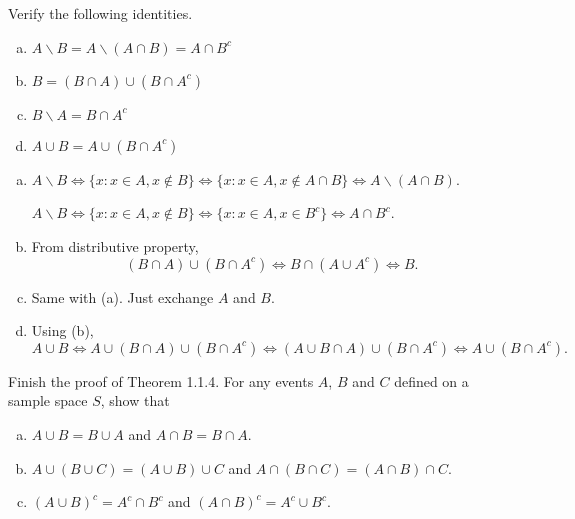 \documentclass[14pt]{elegantbook}
\begin{document}

\chapter{}

    \setcounter{exer}{1}
    \begin{exercise}
        Verify the following identities. 
        \begin{enumerate}[(a)]
            \item $A\backslash B=A\backslash (A\cap B)=A\cap B^c$
            \item $B=(B\cap A)\cup (B\cap A^c)$
            \item $B\backslash A=B\cap A^c$
            \item $A\cup B=A\cup (B\cap A^c)$
        \end{enumerate}
    \end{exercise}

    \begin{solution}
        \begin{enumerate}[(a)]
            \item $A\backslash B \Leftrightarrow \{x: x\in A, x\notin B\}\Leftrightarrow \{x:x\in A, x\notin A\cap B\}\Leftrightarrow A\backslash (A\cap B)$. 
            
            $A\backslash B \Leftrightarrow \{x: x\in A, x\notin B\}\Leftrightarrow\{x:x\in A, x\in B^c\}\Leftrightarrow A\cap B^c$. 
            \item From distributive property, 
            \[
                (B\cap A)\cup (B\cap A^c) \Leftrightarrow B\cap (A\cup A^c)\Leftrightarrow B. 
            \]
            \item Same with (a). Just exchange $A$ and $B$. 
            \item Using (b), \[
                A\cup B\Leftrightarrow A\cup (B\cap A)\cup (B\cap A^c)\Leftrightarrow (A\cup B\cap A)\cup (B\cap A^c)\Leftrightarrow A\cup (B\cap A^c). 
            \]
        \end{enumerate}
    \end{solution}

    \begin{exercise}
        Finish the proof of Theorem 1.1.4. For any events $A$, $B$ and $C$ defined on a sample space $S$, show that
        \begin{enumerate}[(a)]
            \item $A\cup B=B\cup A$ and $A\cap B=B\cap A$. 
            \item $A\cup (B\cup C)=(A\cup B)\cup C$ and $A\cap (B\cap C)=(A\cap B)\cap C$. 
            \item $(A\cup B)^c=A^c\cap B^c$ and $(A\cap B)^c=A^c\cup B^c$. 
        \end{enumerate}
    \end{exercise}
\end{document}
